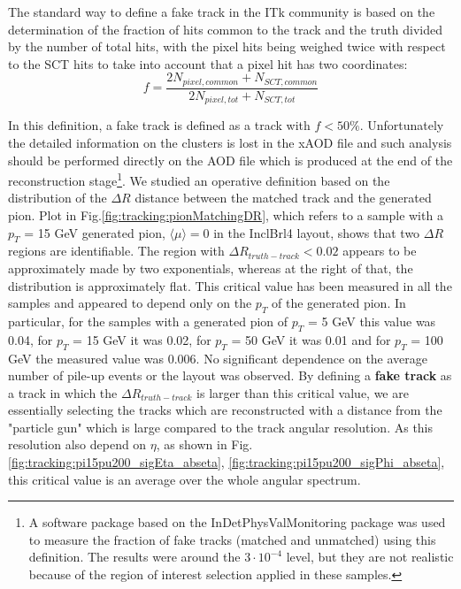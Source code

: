 \documentclass[a4paper,twoside,12pt]{book}
\begin{document}
The standard way to define a fake track in the ITk community is based on the determination of
 the fraction of hits common to the track and the truth divided by the number of total hits, with the pixel hits being weighed twice with respect to the SCT hits to take into account that a pixel hit has two coordinates: \\
$$
f = \frac{2N_{pixel, common} + N_{SCT, common}}{2N_{pixel, tot} + N_{SCT, tot}}
$$

In this definition, a fake track is defined as a track with $f < 50\%$. Unfortunately the detailed information on the clusters is lost in the xAOD file and such analysis should be performed directly on the AOD file
which is produced at the end of the reconstruction stage\footnote{A software package based on the InDetPhysValMonitoring package was used to measure the fraction of fake tracks (matched and unmatched) using this definition. The results were around the $3\cdot 10^{-4}$ level, but they are not realistic because of the region of interest selection applied in these samples.}. We studied an operative definition based on the distribution of the $\Delta R$ distance between the matched track and
the generated pion. Plot in Fig.\ref{fig:tracking:pionMatchingDR}, which refers to a sample with a $p_{T}$ = 15 GeV generated pion, $\langle\mu\rangle = 0$ in the InclBrl4 layout, shows 
that two $\Delta R$ regions are identifiable. The region with $\Delta R_{truth-track} < 0.02$ appears to be approximately made by two exponentials, whereas at the right of that, the distribution is approximately flat. This critical value has been measured in all the samples and appeared to depend only on the $p_{T}$ of the generated pion. In particular, for the samples with a generated pion of $p_{T}$ = 5 GeV this value was 0.04, for $p_{T}$ = 15 GeV it was 0.02, for $p_{T}$ = 50 GeV it was 0.01 and for $p_{T}$ = 100 GeV the measured value was 0.006. No significant dependence on the average number of pile-up events or the layout was observed. By defining
a \textbf{fake track} as a track in which the $\Delta R_{truth-track}$ is larger than this critical value, we are essentially selecting the tracks
which are reconstructed with a distance from the "particle gun" which is large compared to the track angular resolution. As this resolution also depend on $\eta$, as shown in Fig.
\ref{fig:tracking:pi15pu200_sigEta_abseta}, \ref{fig:tracking:pi15pu200_sigPhi_abseta}, this critical value is an average over the whole angular spectrum.\\
\end{document}
